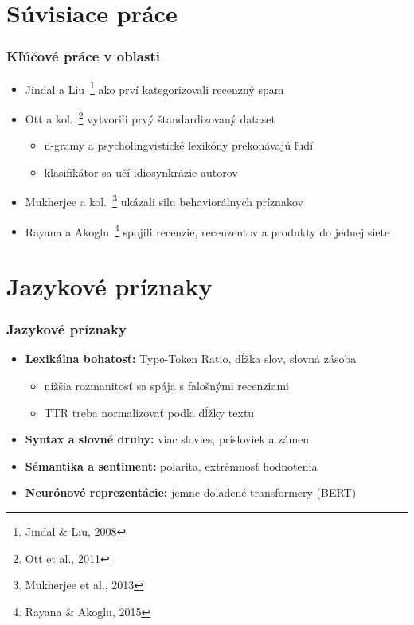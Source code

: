 \documentclass{beamer}
\newcommand{\footcite}[1]{\footnote{\tiny #1}}
\begin{document}
\section{Súvisiace práce}

\begin{frame}[fragile=singleslide]\frametitle{Kľúčové práce v oblasti}
\begin{itemize}
\item Jindal a Liu~\footcite{\tiny Jindal \& Liu, 2008} ako prví kategorizovali recenzný spam
\item Ott a kol.~\footcite{\tiny Ott et al., 2011} vytvorili prvý štandardizovaný dataset
	\begin{itemize}
	\item n-gramy a psycholingvistické lexikóny prekonávajú ľudí
	\item klasifikátor sa učí idiosynkrázie autorov
	\end{itemize}
\item Mukherjee a kol.~\footcite{\tiny Mukherjee et al., 2013} ukázali silu behaviorálnych príznakov
\item Rayana a Akoglu~\footcite{\tiny Rayana \& Akoglu, 2015} spojili recenzie, recenzentov a produkty do jednej siete
\end{itemize}
\end{frame}


\section{Jazykové príznaky}

\begin{frame}[fragile=singleslide]\frametitle{Jazykové príznaky}
\begin{itemize}
\item \textbf{Lexikálna bohatosť:} Type-Token Ratio, dĺžka slov, slovná zásoba
	\begin{itemize}
	\item nižšia rozmanitosť sa spája s falošnými recenziami
	\item TTR treba normalizovať podľa dĺžky textu
	\end{itemize}
\item \textbf{Syntax a slovné druhy:} viac slovies, prísloviek a zámen
\item \textbf{Sémantika a sentiment:} polarita, extrémnosť hodnotenia
\item \textbf{Neurónové reprezentácie:} jemne doladené transformery (BERT)
\end{itemize}
\end{frame}
\end{document}
